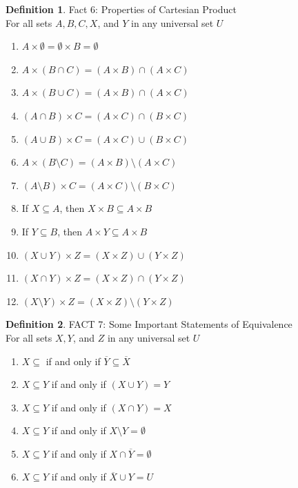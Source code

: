 \documentclass{book}
\theoremstyle{definition}
\newtheorem{definition}{Definition}[section]
\theoremstyle{remark}
\begin{document}
\begin{definition}
Fact 6: Properties of Cartesian Product \\

For all sets $A, B, C, X$, and $Y$ in any universal set $U$ \\

    \begin{enumerate}
        \item $A \times \emptyset = \emptyset \times B = \emptyset$
        \item $A \times (B \cap C) = (A \times B) \cap (A \times C)$
        \item $A \times (B \cup C) = (A \times B) \cap (A \times C)$        
        \item $(A \cap B) \times C = (A \times C) \cap (B \times C)$        
        \item $(A \cup B) \times C = (A \times C) \cup (B \times C)$ 
        \item $A \times (B \setminus C) = (A \times B) \setminus (A \times C)$            
        \item $(A \setminus B) \times C = (A \times C) \setminus (B \times C)$   
        \item If $X \subseteq A$, then $X \times B \subseteq A \times B$
        \item If $Y \subseteq B$, then $A \times Y \subseteq A \times B$
        \item $(X \cup Y) \times Z = (X \times Z) \cup (Y \times Z)$
        \item $(X \cap Y) \times Z = (X \times Z) \cap (Y \times Z)$
        \item $(X \setminus Y) \times Z = (X \times Z) \setminus (Y \times Z)$
    \end{enumerate}
\end{definition}



\begin{definition}
FACT 7: Some Important Statements of Equivalence \\

For all sets $X, Y$, and $Z$ in any universal set $U$ \\

    \begin{enumerate}
        \item $X \subseteq $ if and only if $\overline{Y} \subseteq \overline{X}$
        \item $X \subseteq Y $ if and only if $(X \cup Y) = Y$
        \item $X \subseteq Y $ if and only if $ (X \cap Y) = X$
        \item $X \subseteq Y $ if and only if $ X \setminus Y = \emptyset$
        \item $X \subseteq Y $ if and only if $ X \cap \overline{Y} = \emptyset$
        \item $X \subseteq Y $ if and only if $ \overline{X} \cup Y = U$
    \end{enumerate}
\end{definition}
\end{document}
